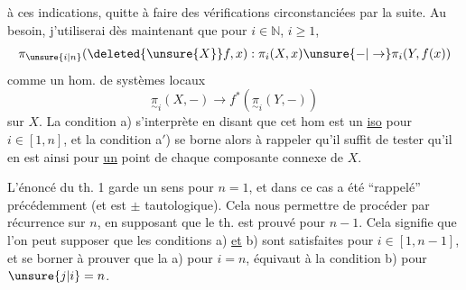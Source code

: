 à ces indications, quitte à faire des vérifications circonstanciées par la suite. Au besoin, j'utiliserai dès maintenant que pour $i\in\mathbb N$, $i\geq1$,
\[
\pi_{\unsure{i|n}}(\deleted{\unsure{X}}f,x):\pi_i(X,x)\unsure{-|\to}\pi_i(Y,f(x))
\]
  comme  un hom. de systèmes locaux
\[
\underset{\sim}{\pi}_i(X,-)\longrightarrow f^*(\underset{\sim}{\pi}_i(Y,-))
\]
sur $X$. La condition a)  s'interprète en disant que cet hom est un \uline{iso} pour $i\in[1,n]$, et la condition a$'$) se borne alors à rappeler qu'il suffit de tester qu'il en est ainsi pour \uline{un} point de chaque composante connexe de $X$.

L'énoncé du th. 1 garde un sens pour $n=1$, et dans ce cas a été ``rappelé'' précédemment (et est $\pm$ tautologique).
Cela\unsure{$=$}  nous permettre de procéder par récurrence sur $n$, en supposant que le th. est prouvé pour $n-1$. Cela signifie que l'on peut supposer que les conditions a) \uline{et} b) sont satisfaites  pour $i\in[1,n-1]$, et se borner à prouver que   la  a) pour $i=n$, équivaut à la condition b) pour $\unsure{j|i}=n$.
